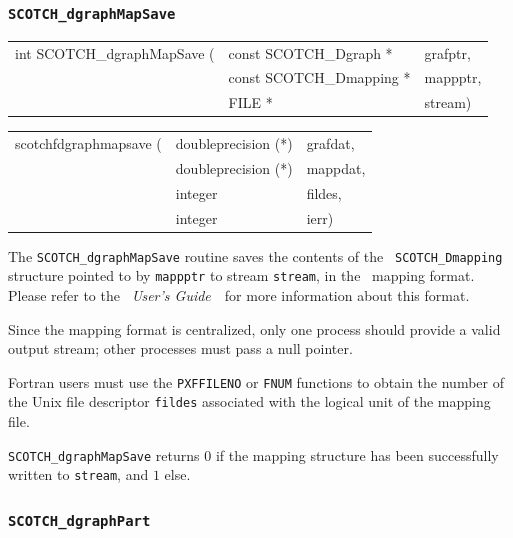 \subsubsection{{\tt SCOTCH\_dgraphMapSave}}

\begin{itemize}
\progsyn

{\tt\begin{tabular}{l@{}ll}
int SCOTCH\_dgraphMapSave ( & const SCOTCH\_Dgraph *   & grafptr, \\
                            & const SCOTCH\_Dmapping * & mappptr, \\
                            & FILE *                   & stream)
\end{tabular}}

{\tt\begin{tabular}{l@{}ll}
scotchfdgraphmapsave ( & doubleprecision (*) & grafdat, \\
                       & doubleprecision (*) & mappdat, \\
                       & integer             & fildes,  \\
                       & integer             & ierr)
\end{tabular}}

\progdes

The {\tt SCOTCH\_dgraphMapSave} routine saves the contents of the {\tt
SCOTCH\_\lbt Dmapping} structure pointed to by {\tt mappptr} to stream
{\tt stream}, in the \scotch\ mapping format. Please refer to the
{\it\scotch\ User's Guide}~\scotchcitesuser\ for more information about
this format.

Since the mapping format is centralized, only one process should
provide a valid output stream; other processes must pass a null
pointer.

Fortran users must use the {\tt PXFFILENO} or {\tt FNUM} functions to
obtain the number of the Unix file descriptor {\tt fildes} associated
with the logical unit of the mapping file.

\progret

{\tt SCOTCH\_dgraphMapSave} returns $0$ if the mapping structure
has been successfully written to {\tt stream}, and $1$ else.
\end{itemize}

\subsubsection{{\tt SCOTCH\_dgraphPart}}

